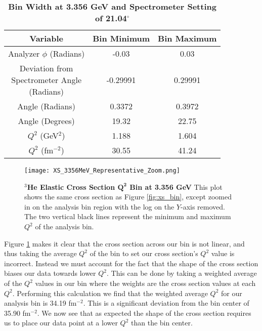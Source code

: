 \vspace{5mm}

\begin{table}[!h]
\centering
\begin{tabular}{|c | c c |}
\hline
\textbf{Variable} & \textbf{Bin Minimum} & \textbf{Bin Maximum}\\
\hline
Analyzer $\phi$ (Radians) & -0.03 & 0.03\\ 
\makecell{Deviation from \\ Spectrometer Angle \\ (Radians)} & -0.29991 & 0.29991\\
Angle (Radians) & 0.3372 &  0.3972\\
Angle (Degrees) & 19.32 & 22.75\\
$Q^2$ (GeV$^2$) & 1.188 & 1.604\\
$Q^2$ (fm$^{-2}$) & 30.55 & 41.24\\
\hline
\end{tabular}
\caption[Bin Width at 3.356 GeV and Spectrometer Setting of 21.04$^\circ$]{{\bf{Bin Width at 3.356 GeV and Spectrometer Setting of 21.04$^\circ$}} }
\label{tab:bin}
\end{table}

\begin{figure}[!ht]
\begin{center}
\texttt{[image: XS\_3356MeV\_Representative\_Zoom.png]}
\end{center}
\caption[$^3$He Elastic Cross Section $Q^2$ Bin at $E_0$ 3.356 GeV]{
{\bf{$^3$He Elastic Cross Section $\boldsymbol{Q^2}$ Bin at 3.356 GeV}} This plot shows the same cross section as Figure \ref{fig:xs_bin}, except zoomed in on the analysis bin region with the log on the $Y$-axis removed. The two vertical black lines represent the minimum and maximum $Q^2$ of the analysis bin.}
\label{fig:xs_bin_zoom}
\end{figure}

Figure \ref{fig:xs_bin_zoom} makes it clear that the cross section across our bin is not linear, and thus taking the average $Q^2$ of the bin to set our cross section's $Q^2$ value is incorrect. Instead we must account for the fact that the shape of the cross section biases our data towards lower $Q^2$. This can be done by taking a weighted average of the $Q^2$ values in our bin where the weights are the cross section values at each $Q^2$. Performing this calculation we find that the weighted average $Q^2$ for our analysis bin is 34.19 fm$^{-2}$. This is a significant deviation from the bin center of 35.90 fm$^{-2}$. We now see that as expected the shape of the cross section requires us to place our data point at a lower $Q^2$ than the bin center.

